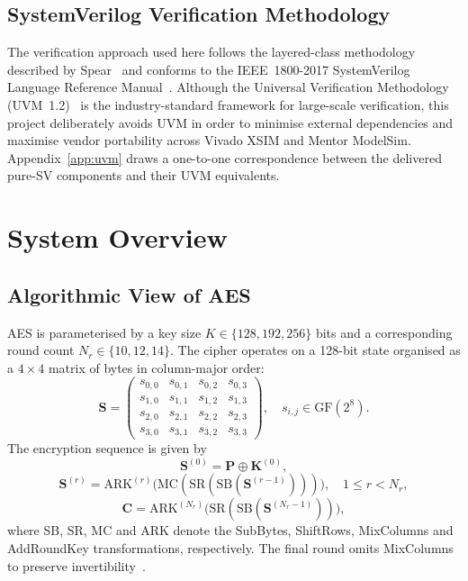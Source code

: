 \documentclass[conference,10pt,a4paper]{IEEEtran}
\begin{document}
\subsection{SystemVerilog Verification Methodology}
The verification approach used here follows the layered-class methodology
described by Spear~\cite{spear} and conforms to the IEEE~1800-2017
SystemVerilog Language Reference Manual~\cite{ieee1800}.  Although the
Universal Verification Methodology (UVM~1.2)~\cite{uvm12} is the
industry-standard framework for large-scale verification, this project
deliberately avoids UVM in order to minimise external dependencies and
maximise vendor portability across Vivado XSIM and Mentor ModelSim.
Appendix~\ref{app:uvm} draws a one-to-one correspondence between the
delivered pure-SV components and their UVM equivalents.

\section{System Overview}
\label{sec:sysover}

\subsection{Algorithmic View of AES}
AES is parameterised by a key size $K \in \{128,192,256\}$ bits and a
corresponding round count $N_r \in \{10,12,14\}$.  The cipher operates on
a 128-bit state organised as a $4\times 4$ matrix of bytes in column-major
order:
\[
\mathbf{S} = \begin{pmatrix}
s_{0,0} & s_{0,1} & s_{0,2} & s_{0,3} \\
s_{1,0} & s_{1,1} & s_{1,2} & s_{1,3} \\
s_{2,0} & s_{2,1} & s_{2,2} & s_{2,3} \\
s_{3,0} & s_{3,1} & s_{3,2} & s_{3,3}
\end{pmatrix}, \quad s_{i,j}\in\mathrm{GF}(2^8).
\]
The encryption sequence is given by
\[
\mathbf{S}^{(0)} = \mathbf{P} \oplus \mathbf{K}^{(0)},
\]
\[
\mathbf{S}^{(r)} = \mathrm{ARK}^{(r)}\!\bigl(
\mathrm{MC}(\mathrm{SR}(\mathrm{SB}(\mathbf{S}^{(r-1)})))\bigr),
\quad 1 \le r < N_r,
\]
\[
\mathbf{C} = \mathrm{ARK}^{(N_r)}\!\bigl(\mathrm{SR}(\mathrm{SB}(\mathbf{S}^{(N_r-1)}))\bigr),
\]
where SB, SR, MC and ARK denote the SubBytes, ShiftRows, MixColumns and
AddRoundKey transformations, respectively.  The final round omits
MixColumns to preserve invertibility~\cite[\S5.1]{fips197}.
\end{document}
